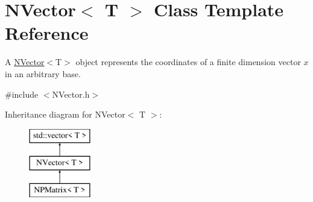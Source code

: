 \hypertarget{class_n_vector}{}\section{N\+Vector$<$ T $>$ Class Template Reference}
\label{class_n_vector}


A {\ttfamily \mbox{\hyperlink{class_n_vector}{N\+Vector}}$<$T$>$} object represents the coordinates of a finite dimension vector $ x $ in an arbitrary base.  




{\ttfamily \#include $<$N\+Vector.\+h$>$}

Inheritance diagram for N\+Vector$<$ T $>$\+:\begin{figure}[H]
\begin{center}
\leavevmode
\includegraphics[height=3.000000cm]{class_n_vector}
\end{center}
\end{figure}

